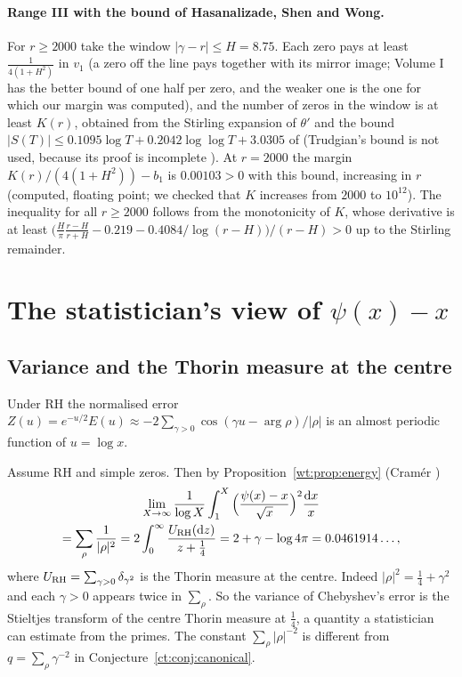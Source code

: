 \paragraph{Range III with the bound of Hasanalizade, Shen and Wong.} For $r\ge2000$ take the window $|\gamma-r|\le H=8.75$. Each zero pays at least $\frac1{4(1+H^2)}$ in $v_1$ (a zero off the line pays together with its mirror image; Volume I has the better bound of one half per zero, and the weaker one is the one for which our margin was computed), and the number of zeros in the window is at least $K(r)$, obtained from the Stirling expansion of $\theta'$ and the bound $|S(T)|\le0.1095\log T+0.2042\log\log T+3.0305$ of \cite{HSW22} (Trudgian's bound is not used, because its proof is incomplete \cite{BMOR21,HSW22}). At $r=2000$ the margin $K(r)/(4(1+H^2))-b_1$ is $0.00103>0$ with this bound, increasing in $r$ (computed, floating point; we checked that $K$ increases from $2000$ to $10^{12}$). The inequality for all $r\ge2000$ follows from the monotonicity of $K$, whose derivative is at least $\big(\frac H\pi\frac{r-H}{r+H}-0.219-0.4084/\log(r-H)\big)/(r-H)>0$ up to the Stirling remainder.

\section{The statistician's view of $\psi(x)-x$}\label{ct:sec:stat}

\subsection{Variance and the Thorin measure at the centre}
Under RH the normalised error $Z(u)=e^{-u/2}E(u)\approx-2\sum_{\gamma>0}\cos(\gamma u-\arg\rho)/|\rho|$ is an almost periodic function of $u=\log x$.

\begin{remark}\label{ct:rem:cramer}
Assume RH and simple zeros. Then by Proposition~\ref{wt:prop:energy} (Cram\'er \cite{Cramer})
\begin{multline*}
\lim_{X\to\infty}\frac1{\log X}\int_1^{X}\Big(\frac{\psi(x)-x}{\sqrt x}\Big)^2\frac{\mathrm{d} x}{x}\\=\sum_\rho\frac{1}{|\rho|^2}=2\int_0^\infty\frac{U_{\rm RH}(\mathrm{d} z)}{z+\frac14}=2+\gamma-\log4\pi=0.0461914\ldots,
\end{multline*}
where $U_{\rm RH}=\sum_{\gamma>0}\delta_{\gamma^2}$ is the Thorin measure at the centre. Indeed $|\rho|^2=\frac14+\gamma^2$ and each $\gamma>0$ appears twice in $\sum_\rho$. So the variance of Chebyshev's error is the Stieltjes transform of the centre Thorin measure at $\frac14$, a quantity a statistician can estimate from the primes. The constant $\sum_\rho|\rho|^{-2}$ is different from $q=\sum_{\rho}\gamma^{-2}$ in Conjecture~\ref{ct:conj:canonical}.
\end{remark}

